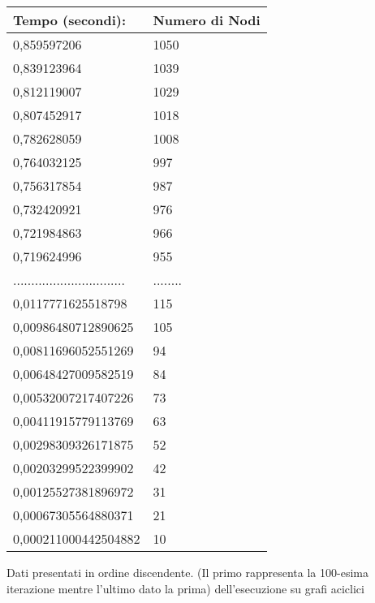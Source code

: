 
\begin{tabular}{|p{}|p{}|}
\hline
Tempo (secondi):&Numero di Nodi\\	
\hline
 0,859597206 & 1050 \\
0,839123964 & 1039 \\
0,812119007	& 1029 \\
0,807452917	& 1018 \\
0,782628059 & 1008 \\
0,764032125	& 997 \\
0,756317854 & 987 \\
0,732420921 & 976 \\
0,721984863	& 966 \\
0,719624996	& 955 \\
............................... & ........\\
0,0117771625518798 & 115 \\ 
0,00986480712890625 & 105 \\ 
0,00811696052551269 & 94 \\ 
0,00648427009582519 & 84 \\ 
0,00532007217407226 & 73 \\ 
0,00411915779113769 & 63 \\ 
0,00298309326171875 & 52 \\ 
0,00203299522399902 & 42 \\ 
0,00125527381896972 & 31 \\ 
0,00067305564880371 & 21 \\ 
0,000211000442504882 & 10 \\ 
\hline
\end{tabular}
\caption{Dati presentati in ordine discendente. (Il primo rappresenta la 100-esima iterazione mentre l'ultimo dato la prima) dell'esecuzione su grafi aciclici}\label{wrap-tab:1}
